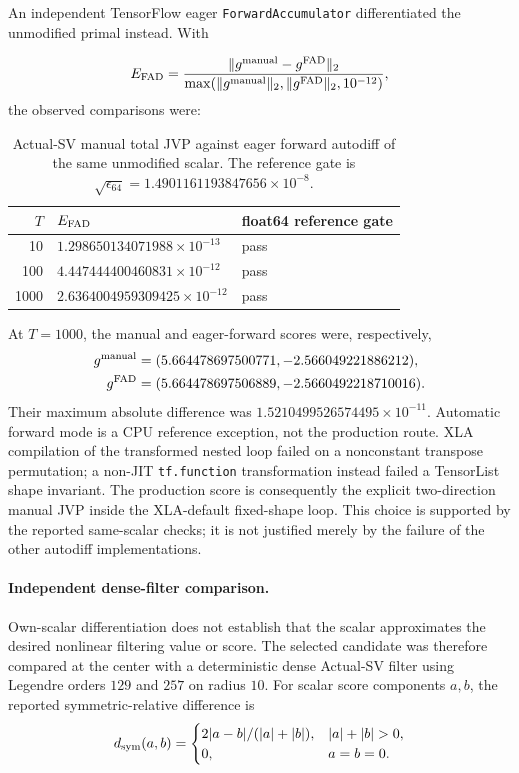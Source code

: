 An independent TensorFlow eager \texttt{ForwardAccumulator} differentiated the
unmodified primal instead.  With

\[
  E_{\rm FAD}
  =\frac{\lVert g^{\rm manual}-g^{\rm FAD}\rVert_2}
         {\max(\lVert g^{\rm manual}\rVert_2,
                    \lVert g^{\rm FAD}\rVert_2,10^{-12})},
\]
the observed comparisons were:

\begin{table}[H]
\centering
\caption{Actual-SV manual total JVP against eager forward autodiff of the same
unmodified scalar.  The reference gate is
\(\sqrt{\epsilon_{64}}=1.4901161193847656\times10^{-8}\).}
\label{tab:bf-ledh-actual-sv-forward-ad-results}
\begin{tabular}{@{}rll@{}}
\toprule
\(T\) & \(E_{\rm FAD}\) & float64 reference gate \\
\midrule
10   & \(1.298650134071988\times10^{-13}\) & pass \\
100  & \(4.447444400460831\times10^{-12}\) & pass \\
1000 & \(2.6364004959309425\times10^{-12}\) & pass \\
\bottomrule
\end{tabular}
\end{table}

At \(T=1000\), the manual and eager-forward scores were, respectively,
\begin{align*}
 g^{\rm manual}&=(5.664478697500771,-2.566049221886212),\\
 g^{\rm FAD}&=(5.664478697506889,-2.5660492218710016).
\end{align*}
Their maximum absolute difference was
\(1.5210499526574495\times10^{-11}\).  Automatic forward mode is a CPU
reference exception, not the production route.  XLA compilation of the
transformed nested loop failed on a nonconstant transpose permutation; a
non-JIT \texttt{tf.function} transformation instead failed a TensorList shape
invariant.  The production score is consequently the explicit two-direction
manual JVP inside the XLA-default fixed-shape loop.  This choice is supported
by the reported same-scalar checks; it is not justified merely by the failure
of the other autodiff implementations.

\paragraph{Independent dense-filter comparison.}
Own-scalar differentiation does not establish that the scalar approximates the
desired nonlinear filtering value or score.  The selected candidate was
therefore compared at the center with a deterministic dense Actual-SV filter
using Legendre orders \(129\) and \(257\) on radius \(10\).  For scalar score
components \(a,b\), the reported symmetric-relative difference is
\begin{equation}
\label{eq:bf-ledh-actual-sv-symmetric-relative}
  d_{\rm sym}(a,b)
  =\begin{cases}
     2|a-b|/(|a|+|b|),& |a|+|b|>0,\\
     0,&a=b=0.
   \end{cases}
\end{equation}

